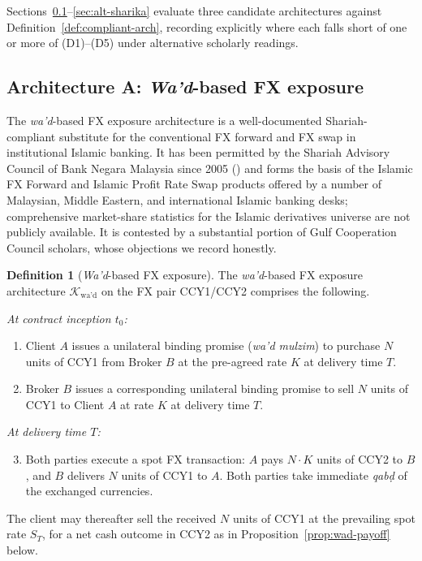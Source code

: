 \documentclass[preprint,12pt,authoryear]{elsarticle}
\theoremstyle{definition}
\newtheorem{definition}{Definition}[section]
\begin{document}
Sections~\ref{sec:alt-wad}--\ref{sec:alt-sharika} evaluate three
candidate architectures against Definition~\ref{def:compliant-arch},
recording explicitly where each falls short of one or more of
(D1)--(D5) under alternative scholarly readings.

\subsection{Architecture A: \emph{Wa'd}-based FX exposure}
\label{sec:alt-wad}

The \emph{wa'd}-based FX exposure architecture is a well-documented
Shariah-compliant substitute for the conventional FX forward and FX
swap in institutional Islamic banking. It has been permitted by the
Shariah Advisory Council of Bank Negara Malaysia
since 2005 (\citealp{Bacha2013}) and forms the basis of the Islamic
FX Forward and Islamic Profit Rate Swap products offered by a
number of Malaysian, Middle Eastern, and international Islamic
banking desks; comprehensive market-share statistics for the
Islamic derivatives universe are not publicly available. It is
contested by a substantial portion of Gulf Cooperation Council
scholars, whose objections we record honestly.

\begin{definition}[\emph{Wa'd}-based FX exposure]
\label{def:wad-fx}
The \emph{wa'd}-based FX exposure architecture
$\mathcal{K}_{\text{wa'd}}$ on the FX pair CCY1/CCY2 comprises the
following.

\emph{At contract inception $t_0$:}
\begin{enumerate}
    \item Client $A$ issues a unilateral binding promise
    (\emph{wa'd mulzim}) to purchase $N$ units of CCY1 from
    Broker $B$ at the pre-agreed rate $K$ at delivery time $T$.
    \item Broker $B$ issues a corresponding unilateral binding
    promise to sell $N$ units of CCY1 to Client $A$ at rate $K$ at
    delivery time $T$.
\end{enumerate}

\emph{At delivery time $T$:}
\begin{enumerate}
    \setcounter{enumi}{2}
    \item Both parties execute a spot FX transaction: $A$ pays
    $N \cdot K$ units of CCY2 to $B$, and $B$ delivers $N$ units of
    CCY1 to $A$. Both parties take immediate \emph{qab\d{d}} of the
    exchanged currencies.
\end{enumerate}
The client may thereafter sell the received $N$ units of CCY1 at
the prevailing spot rate $S_T$, for a net cash outcome in CCY2 as
in Proposition~\ref{prop:wad-payoff} below.
\end{definition}
\end{document}
